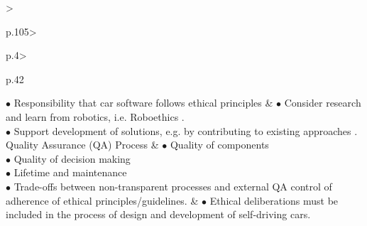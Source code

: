 \begin{table}[t]
\begin{small}
\begin{supertabular}{%
		>{\raggedright}p{.105\textwidth}>{\raggedright}p{.4\textwidth}>{\raggedright}p{.42\textwidth}}
				\noindent $\bullet$ Responsibility that car software follows ethical principles
			& 
				\noindent $\bullet$ Consider research and learn from robotics, i.e. Roboethics \cite{Dodig-Crnkovic:2008:SMR:1566864.1566888}.\\
				\noindent $\bullet$ Support development of solutions, e.g. by contributing to existing approaches \cite{DepartmentforTransportDfT2017}.
 			 \tabularnewline \hline %
			Quality Assurance (QA) Process & 
				 \noindent $\bullet$ Quality of components\\
				 \noindent $\bullet$ Quality of decision making\\
				 \noindent $\bullet$ Lifetime and maintenance\\
				\noindent $\bullet$ Trade-offs between non-transparent processes and external QA control of adherence of ethical principles/guidelines.
			& 
				\noindent $\bullet$ Ethical deliberations must be included in the process of design and development of self-driving cars.\\

\end{supertabular}
\end{small}
\end{table}
